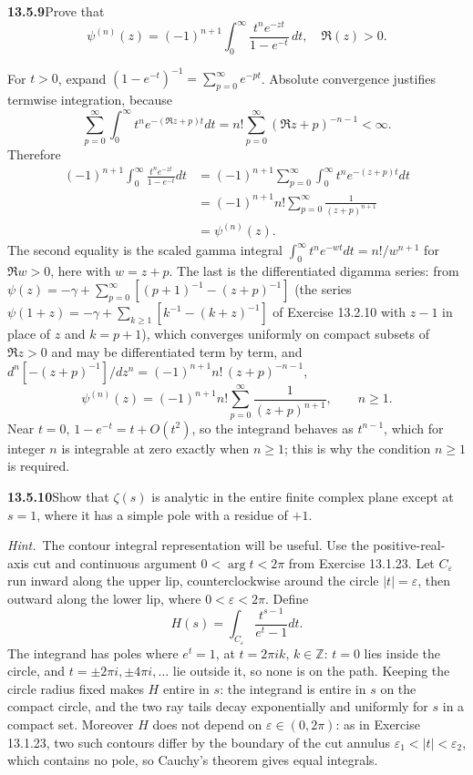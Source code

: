 \par\bigskip
\noindent\textbf{13.5.9}\quad Prove that
\[
\psi^{(n)}(z)=(-1)^{n+1}\int_{0}^{\infty}\frac{t^{n}e^{-zt}}{1-e^{-t}}\,dt,
\quad\Re(z)>0.
\]
\par\smallskip
{}
\solution
{}
For $t>0$, expand $(1-e^{-t})^{-1}=\sum_{p=0}^{\infty}e^{-pt}$.
Absolute convergence justifies termwise integration, because
\[
\sum_{p=0}^{\infty}\int_0^\infty t^ne^{-(\Re z+p)t}dt
=n!\sum_{p=0}^{\infty}(\Re z+p)^{-n-1}<\infty.
\]
Therefore
\begin{align*}
(-1)^{n+1}\int_0^\infty\frac{t^ne^{-zt}}{1-e^{-t}}dt
&=(-1)^{n+1}\sum_{p=0}^{\infty}
\int_0^\infty t^ne^{-(z+p)t}dt\\
&=(-1)^{n+1}n!\sum_{p=0}^{\infty}\frac1{(z+p)^{n+1}}\\
&=\boxed{\psi^{(n)}(z)}.
\end{align*}
The second equality is the scaled gamma integral
$\int_0^\infty t^ne^{-wt}dt=n!/w^{n+1}$ for $\Re w>0$, here with
$w=z+p$.  The last is the differentiated digamma series: from
$\psi(z)=-\gamma+\sum_{p=0}^{\infty}[(p+1)^{-1}-(z+p)^{-1}]$
(the series $\psi(1+z)=-\gamma+\sum_{k\ge1}[k^{-1}-(k+z)^{-1}]$
of Exercise 13.2.10 with $z-1$ in place of $z$ and $k=p+1$),
which converges uniformly on compact subsets of $\Re z>0$ and may
be differentiated term by term, and
$d^n[-(z+p)^{-1}]/dz^n=(-1)^{n+1}n!\,(z+p)^{-n-1}$,
\[
\psi^{(n)}(z)=(-1)^{n+1}n!\sum_{p=0}^{\infty}\frac1{(z+p)^{n+1}},
\qquad n\ge1.
\]
Near $t=0$, $1-e^{-t}=t+O(t^2)$, so the integrand behaves as
$t^{n-1}$, which for integer $n$ is integrable at zero exactly
when $n\ge1$; this is why the condition $n\ge1$ is required.


\par\bigskip
\noindent\textbf{13.5.10}\quad Show that $\zeta(s)$ is analytic in the entire
finite complex plane except at $s=1$, where it has a simple pole with a
residue of $+1$.

\emph{Hint.}~The contour integral representation will be useful.
\solution
Use the positive-real-axis cut and continuous argument
$0<\arg t<2\pi$ from Exercise 13.1.23.  Let $C_\varepsilon$
run inward along the upper lip, counterclockwise around the
circle $|t|=\varepsilon$, then outward along the lower lip,
where $0<\varepsilon<2\pi$.  Define
\[
H(s)=\int_{C_\varepsilon}\frac{t^{s-1}}{e^t-1}dt.
\]
The integrand has poles where $e^t=1$, at $t=2\pi ik$,
$k\in\mathbb Z$: $t=0$ lies inside the circle, and
$t=\pm2\pi i,\pm4\pi i,\ldots$ lie outside it, so none is on the
path.  Keeping the circle radius fixed makes $H$ entire in $s$:
the integrand is entire in $s$ on the compact circle, and the two
ray tails decay exponentially and uniformly for $s$ in a
compact set.  Moreover $H$ does not depend on
$\varepsilon\in(0,2\pi)$: as in Exercise 13.1.23, two such
contours differ by the boundary of the cut annulus
$\varepsilon_1<|t|<\varepsilon_2$, which contains no pole, so
Cauchy's theorem gives equal integrals.


